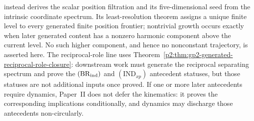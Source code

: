 \documentclass[12pt,a4paper]{article}
\begin{document}
\begin{remark}
instead derives the scalar position filtration and its five-dimensional seed
from the intrinsic coordinate spectrum.  Its least-resolution theorem assigns
a unique finite level to every generated finite position frontier; nontrivial
growth occurs exactly when later generated content has a nonzero harmonic
component above the current level.  No such higher component, and hence no
nonconstant trajectory, is asserted here.  The reciprocal-role line uses
Theorem~\ref{p2:thm:gp2-generated-reciprocal-role-closure}: downstream work
must generate the reciprocal separating spectrum and prove the
\((\mathrm{BR}_{\rm ind})\) and \((\mathrm{IND}_{xp})\) antecedent statuses,
but those statuses are not additional inputs once proved.  If one or more
later antecedents require dynamics, Paper~II does not defer the kinematics: it
proves the corresponding implications conditionally, and dynamics may
discharge those antecedents non-circularly.
\end{remark}
\end{document}
